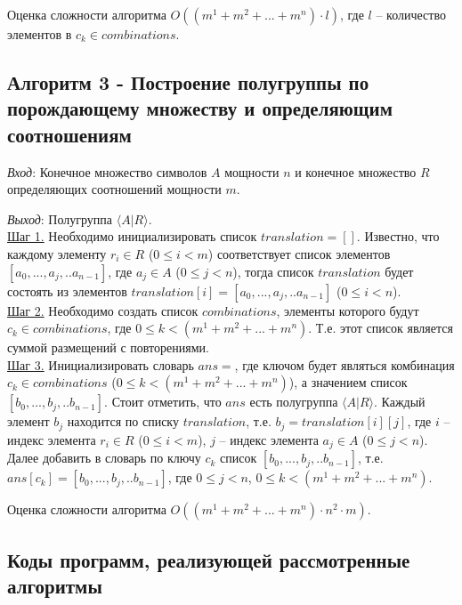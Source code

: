 \documentclass[bachelor, och, labwork]{shiza}
\begin{document}
        Оценка сложности алгоритма $O((m^1 + m^2 + ... + m^n) \cdot l)$, где $l$ -- количество элементов в $c_k \in combinations$.\\

    \subsection{Алгоритм 3 - Построение полугруппы по порождающему множеству и определяющим соотношениям}

        \textit{Вход}: Конечное множество символов $A$ мощности $n$ и конечное множество $R$ определяющих соотношений мощности $m$.

        \textit{Выход}: Полугруппа $\langle A | R \rangle$.\\
        \underline{Шаг 1.} Необходимо инициализировать список $translation = []$. Известно, что каждому элементу $r_i \in R$ ($0 \leq i < m$)
        соответствует список элементов $[a_0,...,a_j,..a_{n-1}]$, где $a_j \in A$ ($0 \leq j < n$), тогда список $translation$ будет
        состоять из элементов $translation[i] = [a_0,...,a_j,..a_{n-1}]$ ($0 \leq i < n$).\\
        \underline{Шаг 2.} Необходимо создать список $combinations$, элементы которого будут $c_k \in combinations$, где $0 \leq k < (m^1 + m^2 + ... + m^n)$.
        Т.е. этот список является суммой размещений с повторениями.\\
        \underline{Шаг 3.} Инициализировать словарь $ans = {}$, где ключом будет являться комбинация $c_k \in combinations$ ($0 \leq k < (m^1 + m^2 + ... + m^n)$),
        а значением список $[b_0,...,b_j,..b_{n-1}]$. Стоит отметить, что $ans$ есть полугруппа $\langle A | R \rangle$. Каждый элемент $b_j$ находится по списку $translation$, т.е. $b_j = translation[i][j]$,
        где $i$ -- индекс элемента $r_i \in R$ ($0 \leq i < m$), $j$ -- индекс элемента $a_j \in A$ ($0 \leq j < n$). Далее добавить в словарь по ключу $c_k$
        список $[b_0,...,b_j,..b_{n-1}]$, т.е. $ans[c_k] = [b_0,...,b_j,..b_{n-1}]$, где $0 \leq j < n$, $0 \leq k < (m^1 + m^2 + ... + m^n)$.

        Оценка сложности алгоритма $O((m^1 + m^2 + ... + m^n) \cdot n^2 \cdot m)$.\\

        \subsection{Коды программ, реализующей рассмотренные алгоритмы}
\end{document}
